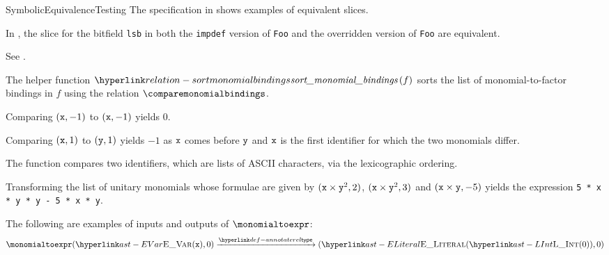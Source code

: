 \begin{TypingRuleList}{SymbolicEquivalenceTesting}
The specification in  shows examples of equivalent slices.

In , the slice for the bitfield \verb|lsb| in both the \texttt{impdef} version
of \verb|Foo| and the overridden version of \verb|Foo| are equivalent.




See .

The helper function $\sortmonomialbindings{f}$ sorts the list of monomial-to-factor bindings in $f$
using the relation $\comparemonomialbindings$.



Comparing $(\texttt{x}, -1)$ to $(\texttt{x}, -1)$ yields $0$.

Comparing $(\texttt{x}, 1)$ to $(\texttt{y}, 1)$ yields $-1$ as $\texttt{x}$ comes before $\texttt{y}$ and $\texttt{x}$ is the
first identifier for which the two monomials differ.

The function  compares two identifiers, which are lists of ASCII characters,
via the lexicographic ordering.



Transforming the list of unitary monomials whose formulae are given by
$(\texttt{x} \times \texttt{y}^2, 2)$,
$(\texttt{x} \times \texttt{y}^2, 3)$ and $(\texttt{x} \times \texttt{y}, -5)$
yields the expression \verb|5 * x * y * y - 5 * x * y|.




The following are examples of inputs and outputs of $\monomialtoexpr$:
\[
\monomialtoexpr(\EVar(\vx), 0) \typearrow (\ELiteral(\LInt(0)), 0)
\]


\end{TypingRuleList}
